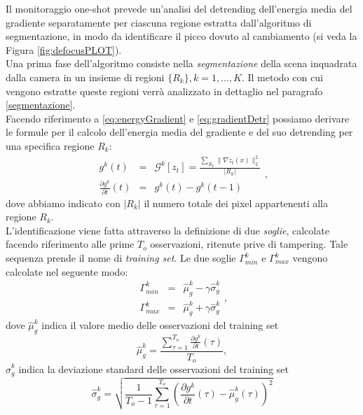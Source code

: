 Il monitoraggio one-shot prevede un'analisi del detrending dell'energia media del gradiente separatamente per ciascuna regione estratta dall'algoritmo di segmentazione, in modo da identificare il picco dovuto al cambiamento (si veda la Figura \ref{fig:defocusPLOT}).\\
Una prima fase dell'algoritmo consiste nella \textit{segmentazione} della scena inquadrata dalla camera in un insieme di regioni $\{R_k\}, k=1,\dots,K$.
Il metodo con cui vengono estratte queste regioni verr\`a analizzato in dettaglio nel paragrafo \ref{segmentazione}. \\
Facendo riferimento a \eqref{eq:energyGradient} e \eqref{eq:gradientDetr} possiamo derivare le formule per il calcolo dell'energia media del gradiente e del suo detrending per una specifica regione $R_k$:
\begin{equation}
\label{eq:gradientRegions}
\begin{array}{ccc}
g^k(t)&  = & \mathcal{G}^k[z_t] = \frac{\sum_{R_k}\| \nabla z_t(x) \| _2^2 }{|{R_k}|}\\
\frac{\partial g^k}{\partial t}(t) & =& g^k(t)-g^k(t-1) 
\end{array},
\end{equation}
dove abbiamo indicato con $|{R_k}|$ il numero totale dei pixel appartenenti alla regione $R_k$.\\
L'identificazione viene fatta attraverso la definizione di due \textit{soglie}, calcolate facendo riferimento alle prime $T_{o}$ osservazioni, ritenute prive di tampering.
Tale sequenza prende il nome di \textit{training set}.
Le due soglie $\Gamma_{min}^k$ e $\Gamma_{max}^k$ vengono calcolate nel seguente modo:
\begin{equation}
\label{eq:soglieGradiente}
\begin{array}{lcl}
\Gamma_{min}^k & = & \hat{\mu}_g^k -\gamma \hat{\sigma}_g^k\\
\Gamma_{max}^k & = & \hat{\mu}_g^k + \gamma \hat{\sigma}_g^k
\end{array},
\end{equation}
dove $\hat{\mu}_g^k$ indica il valore medio delle osservazioni del training set
\begin{equation}
	\hat{\mu}_g^k = \frac{\sum_{\tau = 1}^{T_{o}} \frac{\partial g^k}{\partial t}(\tau)}{T_{o}}, \nonumber
\end{equation}
$\hat{\sigma}_g^k$ indica la deviazione standard delle osservazioni del training set
\begin{equation}
\hat{\sigma}_g^k  = \sqrt{\frac{1}{T_{o}-1}\sum_{\tau=1}^{T_{o}}\left(\frac{\partial g^k}{\partial t}(\tau) - \hat{\mu}_g^k(\tau)\right)^2} \nonumber
\end{equation}
